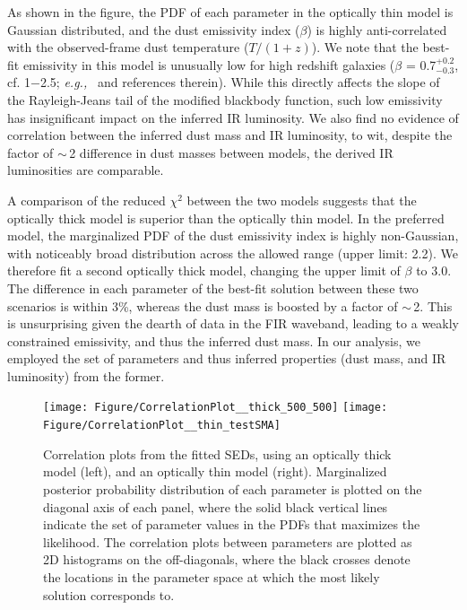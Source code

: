 \documentclass[twocolumn,apj,numberedappendix]{emulateapj}
\newcommand{\eg}{{\sl e.g.,~}}
\begin{document}
As shown in the figure, the PDF of each parameter in the optically thin model is Gaussian distributed, and 
the dust emissivity index ($\beta$) is highly anti-correlated with the observed-frame dust temperature ($T/(1+z)$).
We note that the best-fit emissivity in this model is unusually low for high redshift galaxies ($\beta$ = 0.7$^{+0.2}_{-0.3}$, cf. 1$-$2.5; \eg \citet{Casey12a} and references therein). While this directly affects the slope of the Rayleigh-Jeans tail of the modified blackbody function, such low emissivity has insignificant impact on the inferred IR luminosity.
We also find no evidence of correlation between the inferred dust mass and IR luminosity, to wit, despite the factor of $\sim$\,2 difference
in dust masses 
between models, the derived IR luminosities are comparable.

A comparison of the reduced $\chi^2$ between the two models suggests that the optically thick model is superior than the optically thin model. In the preferred model, the marginalized PDF of the dust emissivity index is highly non-Gaussian, with noticeably broad distribution across 
the allowed range (upper limit: 2.2). We therefore fit a second optically thick model, changing the upper limit of $\beta$ to 3.0. The difference in each 
parameter of the best-fit solution between these two scenarios is within 3\%, whereas the dust mass is boosted by a factor of $\sim$\,2. This is 
unsurprising given the dearth of data in the FIR waveband, leading to a weakly constrained emissivity, and thus the inferred dust mass. 
In our analysis, we employed the set of parameters and thus inferred properties (dust mass, and IR luminosity) from the former.


\begin{figure}[!tbph]
\centering
\texttt{[image: Figure/CorrelationPlot\_\_thick\_500\_500]}
\texttt{[image: Figure/CorrelationPlot\_\_thin\_testSMA]}
\caption{Correlation plots from the fitted SEDs, using an optically thick
model (left), and an optically thin model (right). Marginalized posterior probability 
distribution of each
parameter is plotted on the diagonal axis of each panel, where the solid black vertical lines indicate the set of parameter values in the PDFs that maximizes the likelihood. The correlation plots between parameters are plotted as 2D histograms on the off-diagonals, where the black crosses denote the 
locations in the parameter space
at which the most likely solution corresponds to.
\label{fig:sedlikelihood}}
\end{figure}
\end{document}
